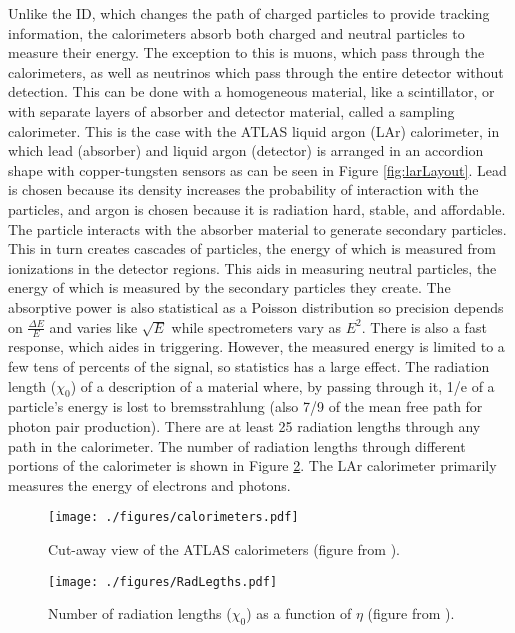 Unlike the ID, which changes the path of charged particles to provide tracking information, the calorimeters absorb both charged and neutral particles to measure their energy.  The exception to this is muons, which pass through the calorimeters, as well as neutrinos which pass through the entire detector without detection.  This can be done with a homogeneous material, like a scintillator, or with separate layers of absorber and detector material, called a sampling calorimeter.  This is the case with the ATLAS liquid argon (LAr) calorimeter, in which lead (absorber) and liquid argon (detector) is arranged in an accordion shape with copper-tungsten sensors as can be seen in Figure \ref{fig:larLayout}.  Lead is chosen because its density increases the probability of interaction with the particles, and argon is chosen because it is radiation hard, stable, and affordable.  The particle interacts with the absorber material to generate secondary particles.  This in turn creates cascades of particles, the energy of which is measured from ionizations in the detector regions.  This aids in measuring neutral particles, the energy of which is measured by the secondary particles they create.  The absorptive power is also statistical as a Poisson distribution so precision depends on $\frac{\Delta E}{E}$ and varies like $\sqrt{E}$ while spectrometers vary as $E^{2}$.  There is also a fast response, which aides in triggering.  However, the measured energy is limited to a few tens of percents of the signal, so statistics has a large effect.  The radiation length ($\chi_{0}$) of a description of a material where, by passing through it, 1/e of a particle's energy is lost to bremsstrahlung (also 7/9 of the mean free path for photon pair production).  There are at least 25 radiation lengths through any path in the calorimeter.  The number of radiation lengths through different portions of the calorimeter is shown in Figure \ref{fig:radLengths}.  The LAr calorimeter primarily measures the energy of electrons and photons.\\

\begin{figure}[h!]
  \centering
	\texttt{[image: ./figures/calorimeters.pdf]}
\caption[Cut-away view of the ATLAS calorimeters]{\label{fig:calorimeters}{ Cut-away view of the ATLAS calorimeters (figure from \cite{DetectorPaper:2008}). }} %
\end{figure}

\begin{figure}[h!]
  \centering
	\texttt{[image: ./figures/RadLegths.pdf]}
\caption[Number of radiation lengths ($\chi_{0}$) as a function of $\eta$]{\label{fig:radLengths}{ Number of radiation lengths ($\chi_{0}$) as a function of $\eta$ (figure from \cite{DetectorPaper:2008}). }} %
\end{figure}


